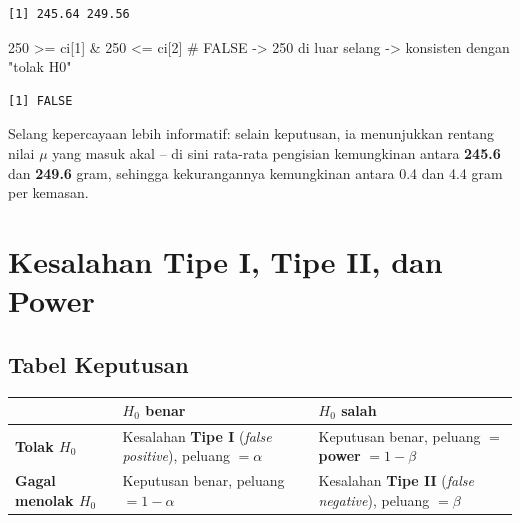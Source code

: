 \documentclass[
  indonesian,
  letterpaper,
]{book}
\newenvironment{Shaded}{\begin{snugshade}}{\end{snugshade}}
\newcommand{\CommentTok}[1]{\textcolor[rgb]{0.37,0.37,0.37}{#1}}
\newcommand{\DecValTok}[1]{\textcolor[rgb]{0.68,0.00,0.00}{#1}}
\newcommand{\NormalTok}[1]{\textcolor[rgb]{0.00,0.23,0.31}{#1}}
\newcommand{\SpecialCharTok}[1]{\textcolor[rgb]{0.37,0.37,0.37}{#1}}
\newcounter{none} %
\begin{document}
\begin{verbatim}
[1] 245.64 249.56
\end{verbatim}

\begin{Shaded}
\begin{Highlighting}[]
\DecValTok{250} \SpecialCharTok{\textgreater{}=}\NormalTok{ ci[}\DecValTok{1}\NormalTok{] }\SpecialCharTok{\&} \DecValTok{250} \SpecialCharTok{\textless{}=}\NormalTok{ ci[}\DecValTok{2}\NormalTok{]   }\CommentTok{\# FALSE {-}\textgreater{} 250 di luar selang {-}\textgreater{} konsisten dengan "tolak H0"}
\end{Highlighting}
\end{Shaded}

\begin{verbatim}
[1] FALSE
\end{verbatim}

Selang kepercayaan lebih informatif: selain keputusan, ia menunjukkan
rentang nilai \(\mu\) yang masuk akal -- di sini rata-rata pengisian
kemungkinan antara \textbf{245.6} dan \textbf{249.6} gram, sehingga
kekurangannya kemungkinan antara 0.4 dan 4.4 gram per kemasan.


\chapter{Kesalahan Tipe I, Tipe II, dan
Power}\label{kesalahan-tipe-i-tipe-ii-dan-power}

\section{Tabel Keputusan}\label{tabel-keputusan}

{\def\LTcaptype{none} %
\begin{longtable}[]{@{}
  >{\raggedright\arraybackslash}p{}
  >{\raggedright\arraybackslash}p{}
  >{\raggedright\arraybackslash}p{}@{}}
\toprule\noalign{}
\begin{minipage}[b]{\linewidth}\raggedright
\end{minipage} & \begin{minipage}[b]{\linewidth}\raggedright
\(H_0\) benar
\end{minipage} & \begin{minipage}[b]{\linewidth}\raggedright
\(H_0\) salah
\end{minipage} \\
\midrule\noalign{}
\endhead
\bottomrule\noalign{}
\endlastfoot
\textbf{Tolak \(H_0\)} & Kesalahan \textbf{Tipe I} (\emph{false
positive}), peluang \(= \alpha\) & Keputusan benar, peluang \(=\)
\textbf{power} \(= 1 - \beta\) \\
\textbf{Gagal menolak \(H_0\)} & Keputusan benar, peluang
\(= 1 - \alpha\) & Kesalahan \textbf{Tipe II} (\emph{false negative}),
peluang \(= \beta\) \\
\end{longtable}
}
\end{document}
